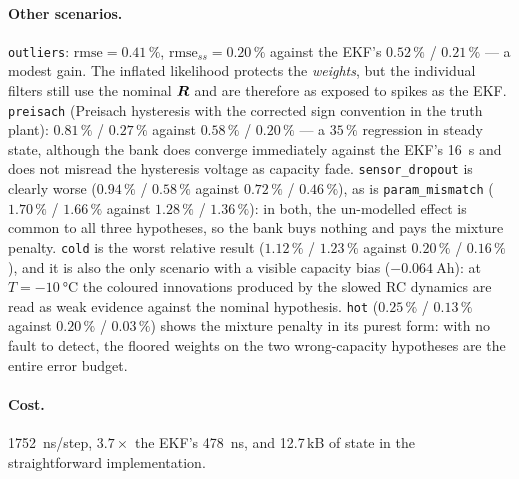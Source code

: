 \paragraph{Other scenarios.}  \texttt{outliers}: $\mathrm{rmse}=0.41\,\%$,
$\mathrm{rmse}_{ss}=0.20\,\%$ against the EKF's $0.52\,\%$ / $0.21\,\%$ --- a modest gain.  The
inflated likelihood protects the \emph{weights}, but the individual filters still use the nominal
$\bm{R}$ and are therefore as exposed to spikes as the EKF.  \texttt{preisach} (Preisach hysteresis with
the corrected sign convention in the truth plant): $0.81\,\%$ / $0.27\,\%$ against $0.58\,\%$ /
$0.20\,\%$ --- a $35\,\%$ regression in steady state, although the bank does converge immediately
against the EKF's \SI{16}{\second} and does not misread the hysteresis voltage as capacity fade.
\texttt{sensor\_dropout} is clearly worse ($0.94\,\%$ / $0.58\,\%$ against $0.72\,\%$ / $0.46\,\%$),
as is \texttt{param\_mismatch} ($1.70\,\%$ / $1.66\,\%$ against $1.28\,\%$ / $1.36\,\%$): in both, the
un-modelled effect is common to all three hypotheses, so the bank buys nothing and pays the mixture
penalty.  \texttt{cold} is the worst relative result ($1.12\,\%$ / $1.23\,\%$ against $0.20\,\%$ /
$0.16\,\%$), and it is also the only scenario with a visible capacity bias
($\SI{-0.064}{\ampere\hour}$): at $T=\SI{-10}{\celsius}$ the coloured innovations produced by the
slowed RC dynamics are read as weak evidence against the nominal hypothesis.  \texttt{hot}
($0.25\,\%$ / $0.13\,\%$ against $0.20\,\%$ / $0.03\,\%$) shows the mixture penalty in its purest
form: with no fault to detect, the floored weights on the two wrong-capacity hypotheses are the
entire error budget.

\paragraph{Cost.}  \SI{1752}{\nano\second}/step, $3.7\times$ the EKF's \SI{478}{\nano\second}, and
12.7\,kB of state in the straightforward implementation.

